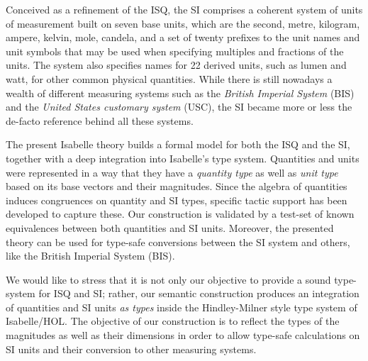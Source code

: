 \documentclass[11pt,a4paper]{book}
\begin{document}
Conceived as a refinement of the ISQ, the SI comprises a coherent system of units of measurement built
 on seven base units, which are the second, metre, kilogram, ampere, kelvin, mole, candela, and a 
set of twenty prefixes to the unit names and unit symbols that may be used when specifying multiples 
and fractions of the units. The system also specifies names for 22 derived units, such as lumen and 
watt, for other common physical quantities. While there is still nowadays a wealth of different 
measuring systems such as the \emph{British Imperial System} (BIS) and the \emph{United States 
customary system} (USC), the SI became more or less the de-facto reference behind all these systems.

The present Isabelle theory builds a formal model for both the ISQ and the SI, together with a 
deep integration into Isabelle's type system. Quantities and units were represented in a way that 
they have a  \emph{quantity type} as well as \emph{unit type} based on its 
base vectors and their magnitudes. Since the algebra of quantities induces congruences on 
quantity and SI types, specific tactic support has been developed to capture these.
Our construction is validated by a test-set of known equivalences between both quantities and SI units.
Moreover, the presented theory can be used for type-safe conversions between the SI system and
others, like the British Imperial System (BIS).

We would like to stress that it is not only our objective to provide a sound type-system for
ISQ and SI; rather, our semantic construction produces an integration of quantities and SI units 
\emph{as types} inside the Hindley-Milner style type system of
 Isabelle/HOL\cite{nipkow.ea:isabelle:2002}. The objective of our construction is to
reflect the types of the magnitudes as well as their dimensions in order to allow type-safe 
calculations on SI units and their conversion to other measuring systems.

% 
\end{document}
